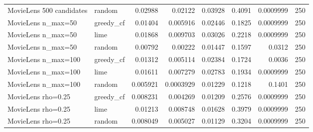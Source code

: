 \begin{table}[t]
\begin{tabular}{llrrrrrr}
MovieLens 500 candidates & random & 0.02988 & 0.02122 & 0.03928 & 0.4091 & 0.0009999 & 250 \\
MovieLens n\_max=50 & greedy\_cf & 0.01404 & 0.005916 & 0.02446 & 0.1825 & 0.0009999 & 250 \\
MovieLens n\_max=50 & lime & 0.01868 & 0.009703 & 0.03026 & 0.2218 & 0.0009999 & 250 \\
MovieLens n\_max=50 & random & 0.00792 & 0.00222 & 0.01447 & 0.1597 & 0.0312 & 250 \\
MovieLens n\_max=100 & greedy\_cf & 0.01312 & 0.005114 & 0.02384 & 0.1724 & 0.0036 & 250 \\
MovieLens n\_max=100 & lime & 0.01611 & 0.007279 & 0.02783 & 0.1934 & 0.0009999 & 250 \\
MovieLens n\_max=100 & random & 0.005921 & 0.0003929 & 0.01229 & 0.1218 & 0.1401 & 250 \\
MovieLens rho=0.25 & greedy\_cf & 0.008231 & 0.004269 & 0.01209 & 0.2576 & 0.0009999 & 250 \\
MovieLens rho=0.25 & lime & 0.01213 & 0.008748 & 0.01628 & 0.3979 & 0.0009999 & 250 \\
MovieLens rho=0.25 & random & 0.008049 & 0.005027 & 0.01129 & 0.3204 & 0.0009999 & 250 \\
\bottomrule
\end{tabular}
\end{table}
